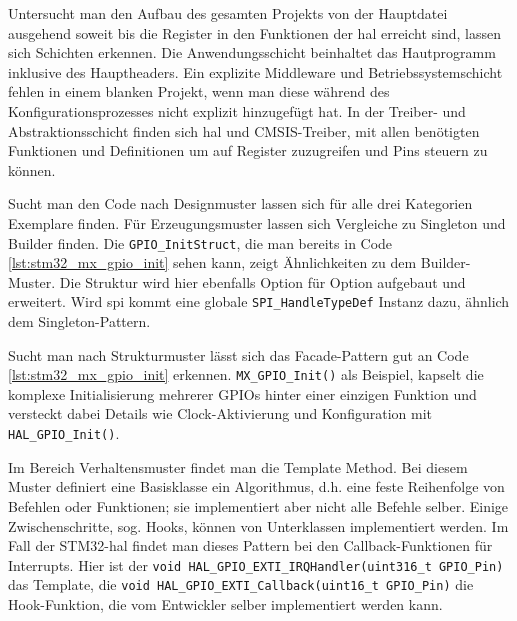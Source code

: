 Untersucht man den Aufbau des gesamten Projekts von der Hauptdatei ausgehend soweit bis die Register in den Funktionen der \gls{hal} erreicht sind, lassen sich Schichten erkennen.
Die Anwendungsschicht beinhaltet das Hautprogramm inklusive des Hauptheaders.
Ein explizite Middleware und Betriebssystemschicht fehlen in einem blanken Projekt, wenn man diese während des Konfigurationsprozesses nicht explizit hinzugefügt hat.
In der Treiber- und Abstraktionsschicht finden sich \gls{hal} und CMSIS-Treiber, mit allen benötigten Funktionen und Definitionen um auf Register zuzugreifen und Pins steuern zu können. 

Sucht man den Code nach Designmuster lassen sich für alle drei Kategorien Exemplare finden.
Für Erzeugungsmuster lassen sich Vergleiche zu Singleton und Builder finden.
Die \texttt{GPIO\_InitStruct}, die man bereits in Code \ref{lst:stm32_mx_gpio_init} sehen kann, zeigt Ähnlichkeiten zu dem Builder-Muster.
Die Struktur wird hier ebenfalls Option für Option aufgebaut und erweitert.
Wird \gls{spi} kommt eine globale \texttt{SPI\_HandleTypeDef} Instanz dazu, ähnlich dem Singleton-Pattern.

Sucht man nach Strukturmuster lässt sich das Facade-Pattern gut an Code \ref{lst:stm32_mx_gpio_init} erkennen.
\texttt{MX\_GPIO\_Init()} als Beispiel, kapselt die komplexe Initialisierung mehrerer GPIOs hinter einer einzigen Funktion und versteckt dabei Details wie Clock-Aktivierung und Konfiguration mit \texttt{HAL\_GPIO\_Init()}.

Im Bereich Verhaltensmuster findet man die Template Method.
Bei diesem Muster definiert eine Basisklasse ein Algorithmus, d.h. eine feste Reihenfolge von Befehlen oder Funktionen; sie implementiert aber nicht alle Befehle selber.
Einige Zwischenschritte, sog. Hooks, können von Unterklassen implementiert werden.
Im Fall der STM32-\gls{hal} findet man dieses Pattern bei den Callback-Funktionen für Interrupts.
Hier ist der \texttt{void HAL\_GPIO\_EXTI\_IRQHandler(uint316\_t GPIO\_Pin)} das Template, die \texttt{void HAL\_GPIO\_EXTI\_Callback(uint16\_t GPIO\_Pin)} die Hook-Funktion, die vom Entwickler selber implementiert werden kann.





